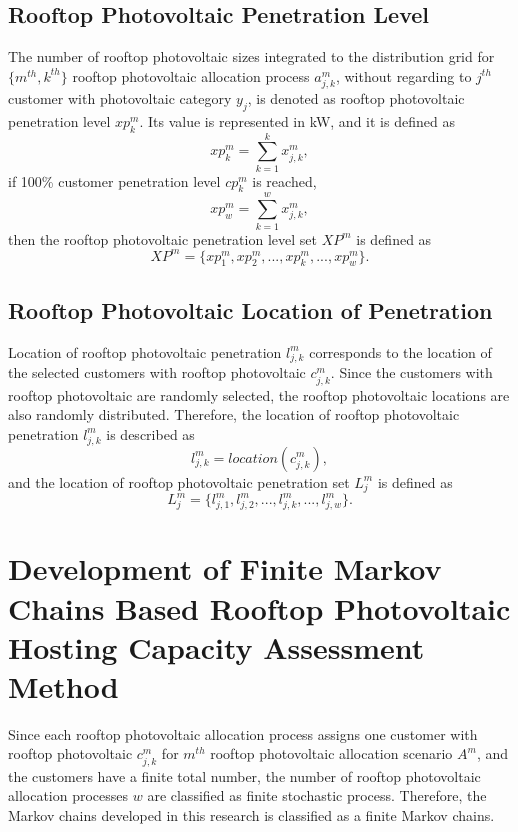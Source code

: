 \subsection{Rooftop Photovoltaic Penetration Level}
The number of rooftop photovoltaic sizes integrated to the distribution grid for $\{m^{th},k^{th}\}$ rooftop photovoltaic allocation process $a^m_{j,k}$, without regarding to $j^{th}$ customer with photovoltaic category $y_j$, is denoted as rooftop photovoltaic penetration level $xp^m_k$. Its value is represented in kW, and it is defined as
\begin{equation}\label{xpl1}
xp^m_k=\sum_{k=1}^k x^m_{j,k},
\end{equation}
if 100\% customer penetration level $cp^m_k$ is reached,
\begin{equation}\label{xpl2}
\mathit{xp^m_w}=\sum_{k=1}^w x^m_{j,k},
\end{equation}
then the rooftop photovoltaic penetration level set $\mathit{XP^m}$ is defined as
\begin{equation}\label{xpl3}
\mathit{XP^m}=\{xp^m_1,xp^m_2,...,xp^m_k,...,xp^m_w\}.
\end{equation}
\subsection{Rooftop Photovoltaic Location of Penetration}
Location of rooftop photovoltaic penetration $l^m_{j,k}$ corresponds to the location of the selected customers with rooftop photovoltaic $c^m_{j,k}$. Since the customers with rooftop photovoltaic are randomly selected, the rooftop photovoltaic locations are also randomly distributed. Therefore, the location of rooftop photovoltaic penetration $l^m_{j,k}$ is described as 
\begin{equation}\label{lpv1}
l^m_{j,k}=location(c^m_{j,k}),
\end{equation}
and the location of rooftop photovoltaic penetration set $\mathit{L^m_j}$ is defined as
\begin{equation}\label{lpv2}
\mathit{L^m_j}=\{l^m_{j,1},l^m_{j,2},...,l^m_{j,k},...,l^m_{j,w}\}.
\end{equation}
\section{Development of Finite Markov Chains Based Rooftop Photovoltaic Hosting Capacity Assessment Method}
Since each rooftop photovoltaic allocation process assigns one customer with rooftop photovoltaic $c^m_{j,k}$ for $m^{th}$ rooftop photovoltaic allocation scenario $A^m$, and the customers have a finite total number, the number of rooftop photovoltaic allocation processes $w$ are classified as finite stochastic process. Therefore, the Markov chains developed in this research is classified as a finite Markov chains.

